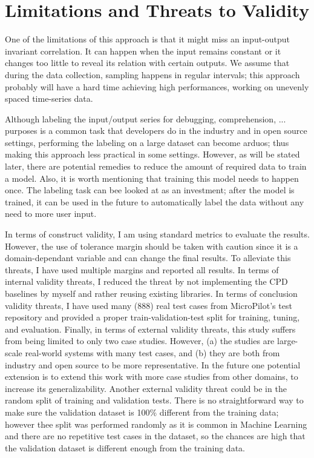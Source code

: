 \section{Limitations and Threats to Validity} \label{sec:threats_to_validity}
One of the limitations of this approach is that it might miss an input-output invariant correlation. It can happen when the input remains constant or it changes too little to reveal its relation with certain outputs. 
We assume that during the data collection, sampling happens in regular intervals; this approach probably will have a hard time achieving high performances, working on unevenly spaced time-series data.

Although labeling the input/output series for debugging, comprehension, ... purposes is a common task that developers do in the industry and in open source settings, performing the labeling on a large dataset can become arduos; thus making this approach less practical in some settings. However, as will be stated later, there are potential remedies to reduce the amount of required data to train a model. Also, it is worth mentioning that training this model needs to happen once. The labeling task can bee looked at as an investment; after the model is trained, it can be used in the future to automatically label the data without any need to more user input.

In terms of construct validity, I am using standard metrics to evaluate the results. However, the use of tolerance margin should be taken with caution since it is a domain-dependant variable and can change the final results. To alleviate this threats, I have used multiple margins and reported all results. In terms of internal validity threats, I reduced the threat by not implementing the CPD baselines by myself and rather reusing existing libraries. In terms of conclusion validity threats, I have used many (888) real test cases from MicroPilot's test repository and provided a proper train-validation-test split for training, tuning, and evaluation. Finally, in terms of external validity threats, this study suffers from being limited to only two case studies. However, (a) the studies are large-scale real-world systems with many test cases, and (b) they are both from industry and open source to be more representative. In the future one potential extension is to extend this work with more case studies from other domains, to increase its generalizability. Another external validity threat could be in the random split of training and validation tests. There is no straightforward way to make sure the validation dataset is 100\% different from the training data; however thee split was performed randomly as it is common in Machine Learning and there are no repetitive test cases in the dataset, so the chances are high that the validation dataset is different enough from the training data.


